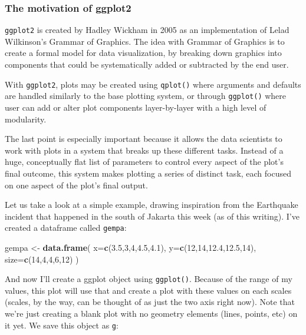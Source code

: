 \documentclass[]{article}
\newenvironment{Shaded}{\begin{snugshade}}{\end{snugshade}}
\newcommand{\DataTypeTok}[1]{\textcolor[rgb]{0.13,0.29,0.53}{#1}}
\newcommand{\DecValTok}[1]{\textcolor[rgb]{0.00,0.00,0.81}{#1}}
\newcommand{\FloatTok}[1]{\textcolor[rgb]{0.00,0.00,0.81}{#1}}
\newcommand{\KeywordTok}[1]{\textcolor[rgb]{0.13,0.29,0.53}{\textbf{#1}}}
\newcommand{\NormalTok}[1]{#1}
\newcommand{\StringTok}[1]{\textcolor[rgb]{0.31,0.60,0.02}{#1}}
\begin{document}
\hypertarget{the-motivation-of-ggplot2}{%
\subsubsection{The motivation of
ggplot2}\label{the-motivation-of-ggplot2}}

\texttt{ggplot2} is created by Hadley Wickham in 2005 as an
implementation of Lelad Wilkinson's Grammar of Graphics. The idea with
Grammar of Graphics is to create a formal model for data visualization,
by breaking down graphics into components that could be systematically
added or subtracted by the end user.

With \texttt{ggplot2}, plots may be created using \texttt{qplot()} where
arguments and defaults are handled similarly to the base plotting
system, or through \texttt{ggplot()} where user can add or alter plot
components layer-by-layer with a high level of modularity.

The last point is especially important because it allows the data
scientists to work with plots in a system that breaks up these different
tasks. Instead of a huge, conceptually flat list of parameters to
control every aspect of the plot's final outcome, this system makes
plotting a series of distinct task, each focused on one aspect of the
plot's final output.

Let us take a look at a simple example, drawing inspiration from the
Earthquake incident that happened in the south of Jakarta this week (as
of this writing). I've created a dataframe called \texttt{gempa}:

\begin{Shaded}
\begin{Highlighting}[]
\NormalTok{gempa <-}\StringTok{ }\KeywordTok{data.frame}\NormalTok{(}
  \DataTypeTok{x=}\KeywordTok{c}\NormalTok{(}\FloatTok{3.5}\NormalTok{,}\DecValTok{3}\NormalTok{,}\DecValTok{4}\NormalTok{,}\FloatTok{4.5}\NormalTok{,}\FloatTok{4.1}\NormalTok{),}
  \DataTypeTok{y=}\KeywordTok{c}\NormalTok{(}\DecValTok{12}\NormalTok{,}\DecValTok{14}\NormalTok{,}\FloatTok{12.4}\NormalTok{,}\FloatTok{12.5}\NormalTok{,}\DecValTok{14}\NormalTok{), }
  \DataTypeTok{size=}\KeywordTok{c}\NormalTok{(}\DecValTok{14}\NormalTok{,}\DecValTok{4}\NormalTok{,}\DecValTok{4}\NormalTok{,}\DecValTok{6}\NormalTok{,}\DecValTok{12}\NormalTok{)}
\NormalTok{)}
\end{Highlighting}
\end{Shaded}

And now I'll create a ggplot object using \texttt{ggplot()}. Because of
the range of my values, this plot will use that and create a plot with
these values on each scales (scales, by the way, can be thought of as
just the two axis right now). Note that we're just creating a blank plot
with no geometry elements (lines, points, etc) on it yet. We save this
object as \texttt{g}:
\end{document}
